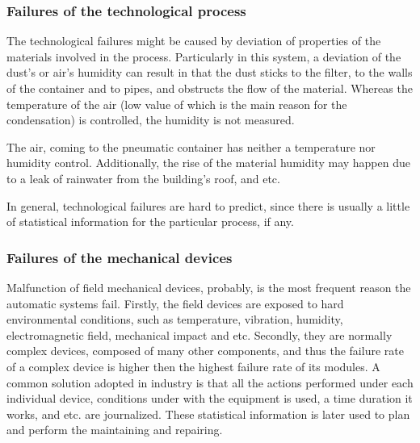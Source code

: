 \subsubsection{Failures of the technological process}

The technological failures might be caused by deviation of properties of the
materials involved in the process. Particularly in this system, a deviation of
the dust's or air's humidity can result in that the dust sticks to the filter,
to the walls of the container and to pipes, and obstructs the flow of the material.
Whereas the temperature of the air (low value of which is the main reason for
the condensation) is controlled, the humidity is not measured.

The air, coming to the pneumatic container has neither a temperature nor
humidity control. Additionally, the rise of the material humidity may happen due
to a leak of rainwater from the building's roof, and etc.

In general, technological failures are hard to predict, since there is
usually a little of statistical information for the particular process, if any. 

\subsubsection{Failures of the mechanical devices}

Malfunction of field mechanical devices, probably, is the most frequent reason
the automatic systems fail. Firstly, the field devices are exposed to hard
environmental conditions, such as temperature, vibration, humidity,
electromagnetic field, mechanical impact and etc. Secondly, they are normally
complex devices, composed of many other components, and thus the failure rate of
a complex device is higher then the highest failure rate of its modules.
A common solution adopted in industry is that all the actions performed under
each individual device, conditions under with the equipment is used, a time
duration it works, and etc. are journalized. These statistical information is
later used to plan and perform the maintaining and repairing.

